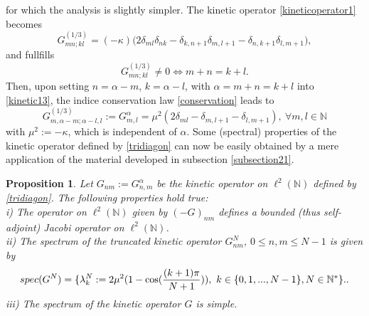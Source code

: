 \documentclass[a4paper]{jpconf}
\numberwithin{equation}{section}
\newtheorem{proposition}[Theorem]{Proposition}
\theoremstyle{nonumberplain}
\begin{document}
for which the analysis is slightly simpler. The kinetic operator \eqref{kineticoperator1} becomes
\begin{equation}
 G^{(1/3)}_{mn;kl}=(-\kappa)\big(2\delta_{ml}\delta_{nk} - \delta_{k,n+1}\delta_{m,l+1}-\delta_{n,k+1}\delta_{l,m+1}\big)\label{kinetic13},
\end{equation}
and fullfills
\begin{equation}
G^{(1/3)}_{mn;kl}\ne0\iff m+n=k+l\label{conservation}.
\end{equation}
Then, upon setting $n=\alpha-m$, $k=\alpha-l$, with $\alpha=m+n=k+l$ into \eqref{kinetic13}, the indice conservation law \eqref{conservation} leads to
\begin{equation}
G^{(1/3)}_{m,\alpha-m;\alpha-l,l}:=G^{\alpha}_{m,l}=\mu^2(2\delta_{ml}- \delta_{m,l+1}-\delta_{l,m+1}),\ \forall m,l\in\mathbb{N}\label{tridiagon}
\end{equation}
with $\mu^2:=-\kappa$, which is independent of $\alpha$. Some (spectral) properties of the kinetic operator defined by \eqref{tridiagon} can now be easily obtained by a mere application of the material developed in subsection \ref{subsection21}.
\begin{proposition}\label{kinetic-G}
Let $G_{nm}:=G^{\alpha}_{n,m}$ be the kinetic operator on $\ell^2(\mathbb{N})$ defined by \eqref{tridiagon}. The following properties hold true:\\
i) The operator on $\ell^2(\mathbb{N})$ given by $(-G)_{nm}$ defines a bounded (thus self-adjoint) Jacobi operator on $\ell^2(\mathbb{N})$.\\
ii) The spectrum of the truncated kinetic operator $G^N_{nm}$, $0\le n,m\le N-1$ is given by 
\begin{equation}
spec(G^N)=\{\lambda^N_k:=2\mu^2(1-\cos({{(k+1)\pi}\over{N+1}})), \ k\in\{0,1,...,N-1\}, N\in\mathbb{N}^*\}.\label{spectrum1}.
\end{equation}
iii) The spectrum of the kinetic operator $G$ is simple.
\end{proposition}
\end{document}
